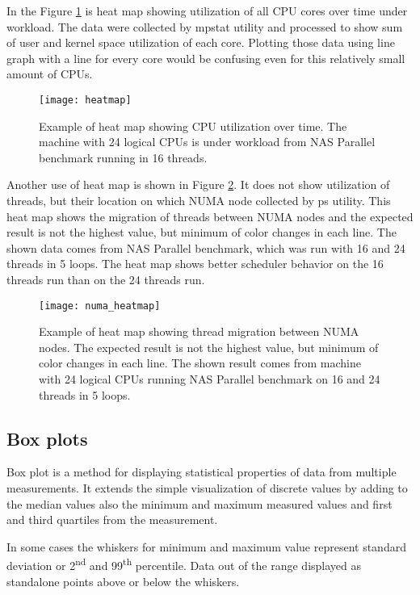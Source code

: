 In the Figure \ref{fig:heatmap} is heat map showing utilization of all CPU cores over
time under workload. The data were collected by mpstat utility and processed to
show sum of user and kernel space utilization of each core. Plotting those data
using line graph with a line for every core would be confusing even for this
relatively small amount of CPUs.

\begin{figure}
  \centering
  \texttt{[image: heatmap]}
  \caption{Example of heat map showing CPU utilization over time. The machine
    with 24 logical CPUs is under workload from NAS Parallel benchmark running
    in 16 threads.}
  \label{fig:heatmap}
\end{figure}

Another use of heat map is shown in Figure \ref{fig:numa_heatmap}. It does not
show utilization of threads, but their location on which NUMA node collected by
ps utility. This heat map shows the migration of threads between NUMA nodes and
the expected result is not the highest value, but minimum of color changes in
each line. The shown data comes from NAS Parallel benchmark, which was run with
16 and 24 threads in 5 loops. The heat map shows better scheduler behavior on
the 16 threads run than on the 24 threads run.

\begin{figure}
  \centering
  \texttt{[image: numa\_heatmap]}
  \caption{Example of heat map showing thread migration between NUMA nodes. The
    expected result is not the highest value, but minimum of color changes in
    each line. The shown result comes from machine with 24 logical CPUs running
    NAS Parallel benchmark on 16 and 24 threads in 5 loops.}
  \label{fig:numa_heatmap}
\end{figure}

\subsection{Box plots}
Box plot is a method for displaying statistical properties of data from multiple
measurements. It extends the simple visualization of discrete values by adding
to the median values also the minimum and maximum measured values and first and
third quartiles from the measurement.

In some cases the whiskers for minimum and maximum value represent standard
deviation or 2\textsuperscript{nd} and 99\textsuperscript{th} percentile. Data
out of the range displayed as standalone points above or below the whiskers.

